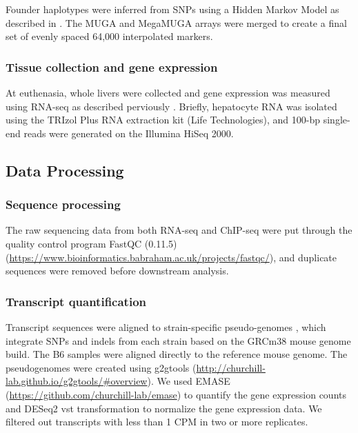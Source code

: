 \documentclass[
  11pt,
]{article}
\begin{document}
Founder haplotypes were inferred from SNPs using a Hidden Markov Model
as described in \citet{Gatti:2014ko}. The MUGA and MegaMUGA arrays were
merged to create a final set of evenly spaced 64,000 interpolated
markers.

\hypertarget{tissue-collection-and-gene-expression}{%
\subsubsection{Tissue collection and gene
expression}\label{tissue-collection-and-gene-expression}}

At euthenasia, whole livers were collected and gene expression was
measured using RNA-seq as described perviously
\citep{pmid27309819, pmid28592500}. Briefly, hepatocyte RNA was isolated
using the TRIzol Plus RNA extraction kit (Life Technologies), and 100-bp
single-end reads were generated on the Illumina HiSeq 2000.

\hypertarget{data-processing}{%
\subsection{Data Processing}\label{data-processing}}

\hypertarget{sequence-processing}{%
\subsubsection{Sequence processing}\label{sequence-processing}}

The raw sequencing data from both RNA-seq and ChIP-seq were put through
the quality control program FastQC (0.11.5)
(\url{https://www.bioinformatics.babraham.ac.uk/projects/fastqc/}), and
duplicate sequences were removed before downstream analysis.

\hypertarget{transcript-quantification}{%
\subsubsection{Transcript
quantification}\label{transcript-quantification}}

Transcript sequences were aligned to strain-specific pseudo-genomes
\citep{pmid27309819}, which integrate SNPs and indels from each strain
based on the GRCm38 mouse genome build. The B6 samples were aligned
directly to the reference mouse genome. The pseudogenomes were created
using g2gtools
(\url{http://churchill-lab.github.io/g2gtools/#overview}). We used EMASE
(\url{https://github.com/churchill-lab/emase}) \citep{pmid29444201} to
quantify the gene expression counts and DESeq2 vst transformation
\citep{love2014moderated} to normalize the gene expression data. We
filtered out transcripts with less than 1 CPM in two or more replicates.
\end{document}
